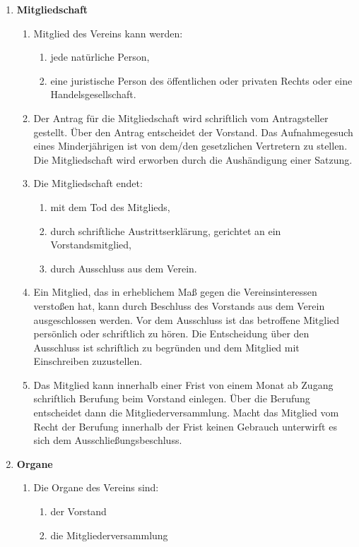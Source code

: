 \documentclass{article}
\begin{document}
\begin{enumerate}[§ 1.]
\item \textsf{\textbf{Mitgliedschaft}}
\begin{enumerate}
\item Mitglied des Vereins kann werden:
\begin{enumerate}
\item jede natürliche Person,
\item eine juristische Person des öffentlichen oder privaten Rechts oder eine Handelsgesellschaft.
\end{enumerate}
\item Der Antrag für die Mitgliedschaft wird schriftlich vom Antragsteller gestellt. Über den Antrag entscheidet der Vorstand. Das Aufnahmegesuch eines Minderjährigen ist von dem/den gesetzlichen Vertretern zu stellen. Die Mitgliedschaft wird erworben durch die Aushändigung einer Satzung.
\item Die Mitgliedschaft endet:
\begin{enumerate}
\item mit dem Tod des Mitglieds,
\item durch schriftliche Austrittserklärung, gerichtet an ein Vorstandsmitglied,
\item durch Ausschluss aus dem Verein.
\end{enumerate}
\item Ein Mitglied, das in erheblichem Maß gegen die Vereinsinteressen verstoßen hat, kann durch Beschluss des Vorstands aus dem Verein ausgeschlossen werden. Vor dem Ausschluss ist das betroffene Mitglied persönlich oder schriftlich zu hören. Die Entscheidung über den Ausschluss ist schriftlich zu begründen und dem Mitglied mit Einschreiben zuzustellen.
\item Das Mitglied kann innerhalb einer Frist von einem Monat ab Zugang schriftlich Berufung beim Vorstand einlegen. Über die Berufung entscheidet dann die
Mitgliederversammlung.
Macht das Mitglied vom Recht der Berufung innerhalb der Frist keinen Gebrauch
unterwirft es sich dem Ausschließungsbeschluss.
\end{enumerate}

\item \textsf{\textbf{Organe}}
\begin{enumerate}
\item[] Die Organe des Vereins sind:
\begin{enumerate}
\item der Vorstand
\item die Mitgliederversammlung
\end{enumerate}
\end{enumerate}


\end{enumerate}
\end{document}
